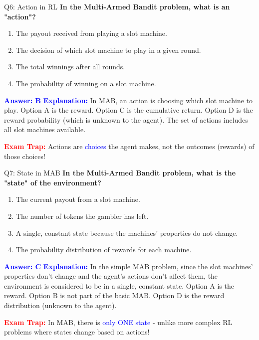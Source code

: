 \documentclass[8pt]{beamer}
\begin{document}
	\begin{frame}{Q6: Action in RL}
		\fontsize{6.5}{7.5}\selectfont
		\textbf{In the Multi-Armed Bandit problem, what is an "action"?}
		
		\begin{enumerate}
			\item The payout received from playing a slot machine.
			\item The decision of which slot machine to play in a given round.
			\item The total winnings after all rounds.
			\item The probability of winning on a slot machine.
		\end{enumerate}
		
		\vspace{0.1cm}
		\textcolor{blue}{\textbf{Answer: B}}
		\vspace{0.1cm}
		\textcolor{blue}{\textbf{Explanation:}} In MAB, an action is choosing which slot machine to play. Option A is the reward. Option C is the cumulative return. Option D is the reward probability (which is unknown to the agent). The set of actions includes all slot machines available.
		
		\textcolor{red}{\textbf{Exam Trap:}} Actions are \textcolor{blue}{choices} the agent makes, not the outcomes (rewards) of those choices!
	\end{frame}
	
	\begin{frame}{Q7: State in MAB}
		\fontsize{6.5}{7.5}\selectfont
		\textbf{In the Multi-Armed Bandit problem, what is the "state" of the environment?}
		
		\begin{enumerate}
			\item The current payout from a slot machine.
			\item The number of tokens the gambler has left.
			\item A single, constant state because the machines' properties do not change.
			\item The probability distribution of rewards for each machine.
		\end{enumerate}
		
		\vspace{0.1cm}
		\textcolor{blue}{\textbf{Answer: C}}
		\vspace{0.1cm}
		\textcolor{blue}{\textbf{Explanation:}} In the simple MAB problem, since the slot machines' properties don't change and the agent's actions don't affect them, the environment is considered to be in a single, constant state. Option A is the reward. Option B is not part of the basic MAB. Option D is the reward distribution (unknown to the agent).
		
		\textcolor{red}{\textbf{Exam Trap:}} In MAB, there is \textcolor{blue}{only ONE state} - unlike more complex RL problems where states change based on actions!
	\end{frame}
	
\end{document}
